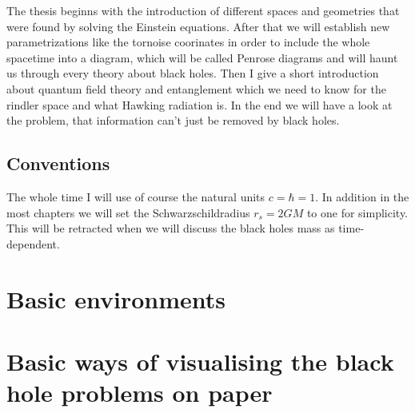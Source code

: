 \documentclass[english, a4, 12pt]{scrartcl}
\begin{document}
	The thesis beginns with the introduction of different spaces and geometries that were found by solving the Einstein equations. After that we will establish new parametrizations like the tornoise coorinates in order to include the whole spacetime into a diagram, which will be called Penrose diagrams and will haunt us through every theory about black holes. 
	Then I give a short introduction about quantum field theory and entanglement which we need to know for  the rindler space and what Hawking radiation is. In the end we will have a look at the problem, that information can't just be removed by black holes.
	
	\subsection{Conventions}
	The whole time I will use of course the natural units $c = \hbar = 1$. In addition in the most chapters we will set the Schwarzschildradius $r_s =2GM$ to one for simplicity. This will be retracted when we will discuss the black holes mass as time-dependent. 
	
\section{Basic environments}
	
	 

	
	 	
	
				
\section{Basic ways of visualising the black hole problems on paper}
	
	
	
			
\end{document}
